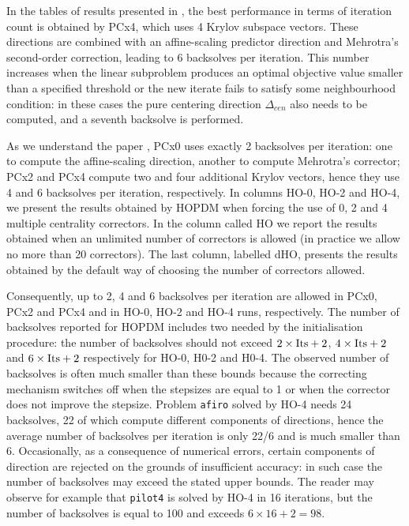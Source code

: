 In the tables of results presented in \cite{MehrotraLi}, the best 
performance in terms of iteration count is obtained by PCx4, which 
uses 4 Krylov subspace vectors. These directions are combined with 
an affine-scaling predictor direction and Mehrotra's second-order 
correction, leading to 6 backsolves per iteration. 
This number increases when the linear subproblem produces an optimal 
objective value smaller than a specified threshold or the new iterate 
fails to satisfy some neighbourhood condition: in these cases 
the pure centering direction $\Delta_{cen}$ also needs to be computed,
and a seventh backsolve is performed.

As we understand the paper \cite{MehrotraLi}, PCx0 uses exactly 
2 backsolves per iteration: one to compute the affine-scaling direction,
another to compute Mehrotra's corrector; PCx2 and PCx4 compute 
two and four additional Krylov vectors, hence they use
4 and 6 backsolves per iteration, respectively.
In columns HO-0, HO-2 and HO-4, we present 
the results obtained by HOPDM when forcing the use of 0, 2 and 4 
multiple centrality correctors. 
In the column called HO\raisebox{1pt}{-$\infty$} we report the results 
obtained when an unlimited number of correctors is allowed
(in practice we allow no more than 20 correctors).
The last column, labelled dHO, presents the results obtained 
by the default way of choosing the number of correctors allowed.

Consequently, up to 2, 4 and 6 backsolves per iteration are allowed
in PCx0, PCx2 and PCx4 and in HO-0, HO-2 and HO-4 runs, respectively.
The number of backsolves reported for HOPDM includes two needed by 
the initialisation procedure: the number of backsolves 
should not exceed $2 \times {\rm {Its}} + 2$, 
$4 \times {\rm {Its}} + 2$ and $6 \times {\rm {Its}} + 2$ respectively
for HO-0, H0-2 and H0-4.
The observed number of backsolves is often much smaller
than these bounds because the correcting mechanism switches off 
when the stepsizes are equal to 1 or when the corrector does not 
improve the stepsize. Problem {\tt afiro} solved by HO-4 needs 24 
backsolves, 22 of which compute different components of directions, 
hence the average number of backsolves per iteration is only 22/6 
and is much smaller than 6. Occasionally,
as a consequence of numerical errors, certain components 
of direction are rejected on the grounds of insufficient accuracy:
in such case the number of backsolves may exceed the stated upper bounds.
The reader may observe for example that {\tt pilot4} is solved by HO-4
in 16 iterations, but the number of backsolves is equal to 100 and 
exceeds $6 \times 16 + 2 = 98$.

